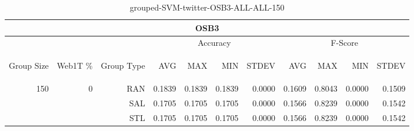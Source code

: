\begin{center}
\begin{table}[htbp] 
 \begin{center}
\begin{tabular}{ | r | r | r | r | r | r | r | r | r | r | r |}
\hline
\multicolumn{11}{|c|}{OSB3}\\
\hline
 & & & \multicolumn{4}{|c|}{Accuracy} & \multicolumn{4}{|c|}{F-Score}\\ \cline{4-11}
\begin{sideways}Group Size\end{sideways} & \begin{sideways}Web1T \%\end{sideways} & \begin{sideways}Group Type\end{sideways} & \begin{sideways}AVG\end{sideways} & \begin{sideways}MAX\end{sideways} & \begin{sideways}MIN\end{sideways} & \begin{sideways}STDEV\end{sideways} & \begin{sideways}AVG\end{sideways} & \begin{sideways}MAX\end{sideways} & \begin{sideways}MIN\end{sideways} & \begin{sideways}STDEV\end{sideways}\\
\hline
\multirow{3}{*}{150}
 & \multirow{3}{*}{0} & RAN & 0.1839 & 0.1839 & 0.1839 & 0.0000 & 0.1609 & 0.8043 & 0.0000 & 0.1509\\ \cline{3-11}
 &   & SAL & 0.1705 & 0.1705 & 0.1705 & 0.0000 & 0.1566 & 0.8239 & 0.0000 & 0.1542\\ \cline{3-11}
 &   & STL & 0.1705 & 0.1705 & 0.1705 & 0.0000 & 0.1566 & 0.8239 & 0.0000 & 0.1542\\ \cline{2-11}
\hline
\end{tabular}
\caption{grouped-SVM-twitter-OSB3-ALL-ALL-150}
\end{center}
 \end{table}
\end{center}

